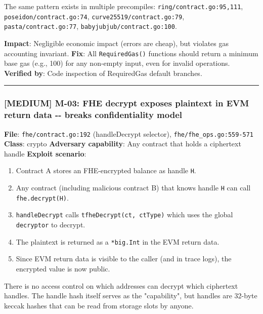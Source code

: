 \documentclass[
]{article}
\providecommand{\tightlist}{%
  \setlength{\itemsep}{0pt}\setlength{\parskip}{0pt}}
\begin{document}
The same pattern exists in multiple precompiles:
\texttt{ring/contract.go:95,111}, \texttt{poseidon/contract.go:74},
\texttt{curve25519/contract.go:79}, \texttt{pasta/contract.go:77},
\texttt{babyjubjub/contract.go:100}.

\textbf{Impact}: Negligible economic impact (errors are cheap), but
violates gas accounting invariant. \textbf{Fix}: All
\texttt{RequiredGas()} functions should return a minimum base gas (e.g.,
100) for any non-empty input, even for invalid operations.
\textbf{Verified by}: Code inspection of RequiredGas default branches.

\begin{center}\rule{0.5\linewidth}{0.5pt}\end{center}

\subsubsection{{[}MEDIUM{]} M-03: FHE decrypt exposes plaintext in EVM
return data -\/- breaks confidentiality
model}\label{medium-m-03-fhe-decrypt-exposes-plaintext-in-evm-return-data----breaks-confidentiality-model}

\textbf{File}: \texttt{fhe/contract.go:192} (handleDecrypt selector),
\texttt{fhe/fhe\_ops.go:559-571} \textbf{Class}: crypto
\textbf{Adversary capability}: Any contract that holds a ciphertext
handle \textbf{Exploit scenario}:

\begin{enumerate}
\def\labelenumi{\arabic{enumi}.}
\tightlist
\item
  Contract A stores an FHE-encrypted balance as handle \texttt{H}.
\item
  Any contract (including malicious contract B) that knows handle
  \texttt{H} can call \texttt{fhe.decrypt(H)}.
\item
  \texttt{handleDecrypt} calls \texttt{tfheDecrypt(ct,\ ctType)} which
  uses the global \texttt{decryptor} to decrypt.
\item
  The plaintext is returned as a \texttt{*big.Int} in the EVM return
  data.
\item
  Since EVM return data is visible to the caller (and in trace logs),
  the encrypted value is now public.
\end{enumerate}

There is no access control on which addresses can decrypt which
ciphertext handles. The handle hash itself serves as the "capability",
but handles are 32-byte keccak hashes that can be read from storage
slots by anyone.
\end{document}
